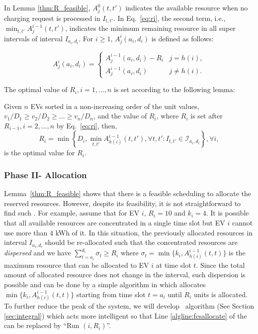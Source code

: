 In Lemma \ref{thm:R_feasible}, $A^0_j(t,t')$ indicates the available resource when no charging request is processed in $I_{t,t'}$. 
In Eq.~\eqref{eq:ri}, the second term, i.e., $\min_{t,t'} A^{i-1}_{j}(t,t')$, indicates the minimum remaining resource in all super intervals of interval $I_{a_i,d_i}$. For $i\geq 1$, $A^i_j(a_i,d_i)$ is defined as follows:

\begin{equation*}
A^i_j(a_i,d_i)=\begin{cases}
A^{i-1}_j(a_i,d_i)-R_i & j=h(i),\\
A^{i-1}_j(a_i,d_i) & j\neq h(i).
\end{cases} 
\end{equation*}

The optimal value of $R_i, i=1,\dots ,n$ is set according to the following lemma:

\begin{lem}
	Given $n$ EVs sorted in a non-increasing order of the unit values, ${v_1\slash D_1\geq v_2\slash D_2\geq\dots \geq v_n\slash D_n}$, and the value of $R_i$, where $R_i$ is set after $R_{i-1}, i=2,\dots ,n$ by Eq.~\eqref{eq:ri}, then, 
	$$R_i = \min\left\{D_i, \min_{t,t'} A^{i-1}_{h(i)}(t,t'), \forall t,t':I_{t,t'}\in\mathcal{I}_{a_i,d_i}\right\},\forall i,$$
	is the optimal value for $R_i$. 
	\label{thm:R_star}
\end{lem}

\subsubsection{Phase II- Allocation\label{sec:ph2}} Lemma~\ref{thm:R_feasible} shows that there is a feasible scheduling to allocate the reserved resources.
However, despite its feasibility, it is not straightforward to find such . For example, assume that for EV $i$, $R_i=10$ and $k_i=4$. It is possible that all available resources are concentrated in a single time slot but EV $i$ cannot use more than $4$ kWh of it. In this situation, the previously allocated resources in interval $I_{a_i,d_i}$ should be re-allocated such that the concentrated resources are \emph{dispersed} and we have $\sum_{t=a_i}^{d_i}\sigma_t \geq R_i$ where $\sigma_t =\min\{k_i,A^{i-1}_{h(i)}(t,t)\}$ is the maximum resource that can be allocated to EV $i$ at time slot $t$. Since the total amount of allocated resource does not change in the interval, such dispersion is possible and can be done by a simple algorithm in which allocates $\min\{k_i,A^{i-1}_{h(i)}(t,t)\}$ starting from time slot $t=a_i$ until $R_i$ units is allocated. To further reduce the peak of the system, we will develop \sa\ algorithm (See Section \ref{sec:integral}) which acts more intelligent so that Line \ref{algline:fcsallocate} of the \fcs can be replaced by ``Run \sa$(i,R_i)$''.



